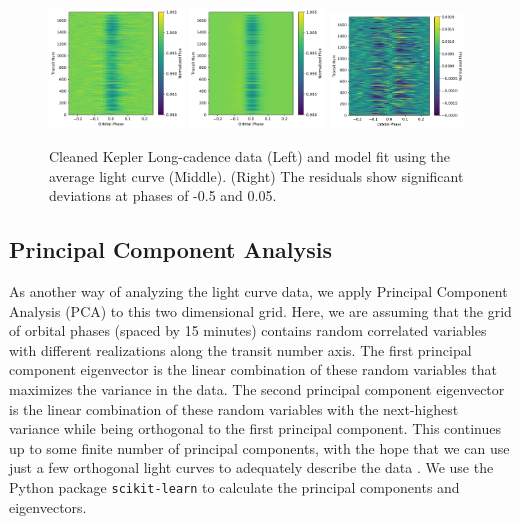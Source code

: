 \documentclass[preprint]{aastex61}
\begin{document}
\begin{figure}[!hbtp]
\begin{centering}
\includegraphics[width=0.32\textwidth]{images/kepler/photometry_riverplot.pdf}
\includegraphics[width=0.32\textwidth]{images/kepler/model_riverplot.pdf}
\includegraphics[width=0.32\textwidth]{images/kepler/residual_riverplot.pdf}
\caption{Cleaned Kepler Long-cadence data (Left) and model fit using the average light curve (Middle).
(Right) The residuals show significant deviations at phases of -0.5 and 0.05.
}\label{fig:riverPlots}
\end{centering}
\end{figure}

\subsection{Principal Component Analysis}

As another way of analyzing the light curve data, we apply Principal Component Analysis (PCA) to this two dimensional grid.
Here, we are assuming that the grid of orbital phases (spaced by 15 minutes) contains random correlated variables with different realizations along the transit number axis.
The first principal component eigenvector is the linear combination of these random variables that maximizes the variance in the data.
The second principal component eigenvector is the linear combination of these random variables with the next-highest variance while being orthogonal to the first principal component.
This continues up to some finite number of principal components, with the hope that we can use just a few orthogonal light curves to adequately describe the data \citep[e.g.][]{jolliffe2002pca}.
We use the Python package \texttt{scikit-learn} \citep{pedregosa2011scikit-learn} to calculate the principal components and eigenvectors.
\end{document}
